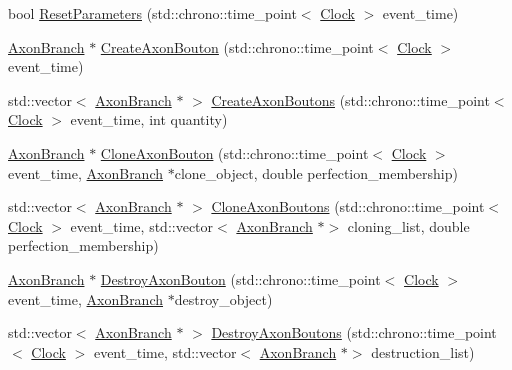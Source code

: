 \begin{DoxyCompactItemize}
\item 
bool \mbox{\hyperlink{class_axon_branch_a195d68dffd37317db3f94e1b4c8f73c7}{Reset\+Parameters}} (std\+::chrono\+::time\+\_\+point$<$ \mbox{\hyperlink{universe_8h_a0ef8d951d1ca5ab3cfaf7ab4c7a6fd80}{Clock}} $>$ event\+\_\+time)
\item 
\mbox{\hyperlink{class_axon_branch}{Axon\+Branch}} $\ast$ \mbox{\hyperlink{class_axon_branch_a30b4602e5dd121666478ff9de52d022b}{Create\+Axon\+Bouton}} (std\+::chrono\+::time\+\_\+point$<$ \mbox{\hyperlink{universe_8h_a0ef8d951d1ca5ab3cfaf7ab4c7a6fd80}{Clock}} $>$ event\+\_\+time)
\item 
std\+::vector$<$ \mbox{\hyperlink{class_axon_branch}{Axon\+Branch}} $\ast$ $>$ \mbox{\hyperlink{class_axon_branch_a77e93626a7993f76e689d09721974e90}{Create\+Axon\+Boutons}} (std\+::chrono\+::time\+\_\+point$<$ \mbox{\hyperlink{universe_8h_a0ef8d951d1ca5ab3cfaf7ab4c7a6fd80}{Clock}} $>$ event\+\_\+time, int quantity)
\item 
\mbox{\hyperlink{class_axon_branch}{Axon\+Branch}} $\ast$ \mbox{\hyperlink{class_axon_branch_ae861207a8a0aeb2b60c305b25248e4b9}{Clone\+Axon\+Bouton}} (std\+::chrono\+::time\+\_\+point$<$ \mbox{\hyperlink{universe_8h_a0ef8d951d1ca5ab3cfaf7ab4c7a6fd80}{Clock}} $>$ event\+\_\+time, \mbox{\hyperlink{class_axon_branch}{Axon\+Branch}} $\ast$clone\+\_\+object, double perfection\+\_\+membership)
\item 
std\+::vector$<$ \mbox{\hyperlink{class_axon_branch}{Axon\+Branch}} $\ast$ $>$ \mbox{\hyperlink{class_axon_branch_a842b3875b2771f4b8e7316bfb9af894c}{Clone\+Axon\+Boutons}} (std\+::chrono\+::time\+\_\+point$<$ \mbox{\hyperlink{universe_8h_a0ef8d951d1ca5ab3cfaf7ab4c7a6fd80}{Clock}} $>$ event\+\_\+time, std\+::vector$<$ \mbox{\hyperlink{class_axon_branch}{Axon\+Branch}} $\ast$$>$ cloning\+\_\+list, double perfection\+\_\+membership)
\item 
\mbox{\hyperlink{class_axon_branch}{Axon\+Branch}} $\ast$ \mbox{\hyperlink{class_axon_branch_a024c8666555702ebe67e2a5caf1b866a}{Destroy\+Axon\+Bouton}} (std\+::chrono\+::time\+\_\+point$<$ \mbox{\hyperlink{universe_8h_a0ef8d951d1ca5ab3cfaf7ab4c7a6fd80}{Clock}} $>$ event\+\_\+time, \mbox{\hyperlink{class_axon_branch}{Axon\+Branch}} $\ast$destroy\+\_\+object)
\item 
std\+::vector$<$ \mbox{\hyperlink{class_axon_branch}{Axon\+Branch}} $\ast$ $>$ \mbox{\hyperlink{class_axon_branch_a8c022977e091b8cab367b21c0c4930ea}{Destroy\+Axon\+Boutons}} (std\+::chrono\+::time\+\_\+point$<$ \mbox{\hyperlink{universe_8h_a0ef8d951d1ca5ab3cfaf7ab4c7a6fd80}{Clock}} $>$ event\+\_\+time, std\+::vector$<$ \mbox{\hyperlink{class_axon_branch}{Axon\+Branch}} $\ast$$>$ destruction\+\_\+list)

\end{DoxyCompactItemize}
